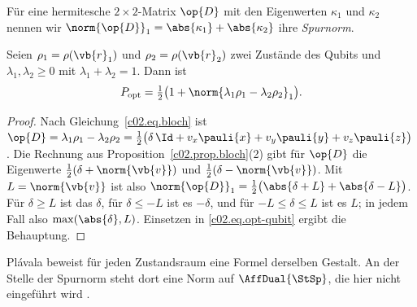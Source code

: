 \begin{vertiefung}[id=c02.v4,
    titel={Das Qubit-Optimum als Spurnorm},
    wozu={Gleichung~\eqref{c02.eq.opt-qubit} lässt sich ohne Koordinaten schreiben, direkt
      mit den Dichtematrizen der beiden Zustände.},
    voraussetzung={Abschnitt~\ref{c02.s4.3} und Proposition~\ref{c02.prop.optimum}.
      Der Kern braucht diesen Block nicht.},
    zurueck={Die Länge $\max(\abs{\delta}, \norm{\vb{v}})$ in
      Gleichung~\eqref{c02.eq.opt-qubit} ist eine Eigenschaft der Matrix
      $\lambda_1\rho_1 - \lambda_2\rho_2$ allein.}]
  Für eine hermitesche $2\times 2$-Matrix $\op{D}$ mit den Eigenwerten $\kappa_1$ und $\kappa_2$
  nennen wir $\norm{\op{D}}_1 = \abs{\kappa_1} + \abs{\kappa_2}$ ihre \emph{Spurnorm}.

  \begin{proposition}[Spurnormformel]\label{c02.prop.spurnorm}
    Seien $\rho_1 = \rho(\vb{r}_1)$ und $\rho_2 = \rho(\vb{r}_2)$ zwei Zustände des Qubits
    und $\lambda_1, \lambda_2 \geq 0$ mit $\lambda_1 + \lambda_2 = 1$. Dann ist
    \begin{equation}\label{c02.eq.spurnorm}
      P_{\mathrm{opt}} = \tfrac12\bigl(1 + \norm{\lambda_1 \rho_1 - \lambda_2 \rho_2}_1\bigr) .
    \end{equation}
  \end{proposition}
  \begin{proof}
    Nach Gleichung~\eqref{c02.eq.bloch} ist
    $\op{D} = \lambda_1\rho_1 - \lambda_2\rho_2
       = \tfrac12\bigl(\delta\, \Id + v_x \pauli{x} + v_y \pauli{y} + v_z \pauli{z}\bigr)$.
    Die Rechnung aus Proposition~\ref{c02.prop.bloch}(2) gibt für $\op{D}$ die Eigenwerte
    $\tfrac12(\delta + \norm{\vb{v}})$ und $\tfrac12(\delta - \norm{\vb{v}})$. Mit
    $L = \norm{\vb{v}}$ ist also
    $\norm{\op{D}}_1 = \tfrac12\bigl(\abs{\delta + L} + \abs{\delta - L}\bigr)$. Für
    $\delta \geq L$ ist das $\delta$, für $\delta \leq -L$ ist es $-\delta$, und für
    $-L \leq \delta \leq L$ ist es $L$; in jedem Fall also $\max(\abs{\delta}, L)$.
    Einsetzen in \eqref{c02.eq.opt-qubit} ergibt die Behauptung.
  \end{proof}

  Plávala beweist für jeden Zustandsraum eine Formel derselben Gestalt. An der Stelle der
  Spurnorm steht dort eine Norm auf $\AffDual{\StSp}$, die hier nicht eingeführt wird
  .
\end{vertiefung}

